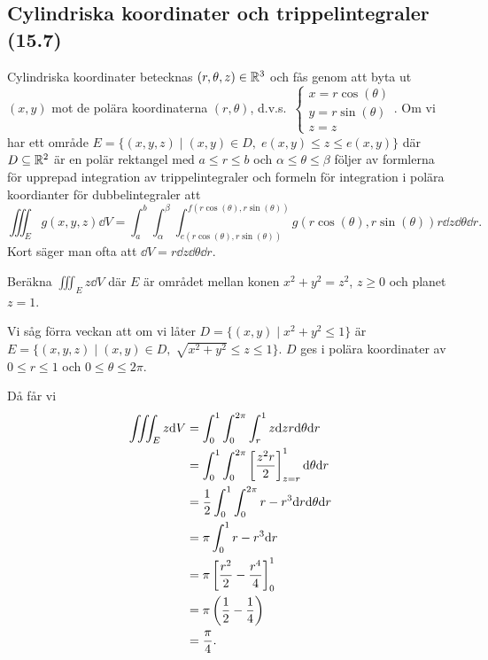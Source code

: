\documentclass[a4paper]{article}
\begin{document}

\subsection{Cylindriska koordinater och trippelintegraler (15.7)}
Cylindriska koordinater betecknas \(
    (r,\theta,z) \in \mathbb{R}^3
\) och fås genom att byta ut \(
    (x,y)
\) mot de polära koordinaterna \(
    (r,\theta)
\), d.v.s.\ \(
    \left\{\begin{matrix}
        x = r \cos(\theta)\\ 
        y = r \sin(\theta)\\ 
        z = z
    \end{matrix}\right.
\). Om vi har ett område \(
    E = \{ (x,y,z) \; | \; (x,y) \in D, \; e(x,y) \leq z \leq e(x,y) \}
\) där \(
    D \subseteq \mathbb{R}^2 
\) är en polär rektangel med \(
    a \leq r \leq b
\) och \(
    \alpha \leq \theta \leq \beta 
\) följer av formlerna för upprepad integration av trippelintegraler och 
formeln för integration i polära koordianter för dubbelintegraler att \[
    \iiint_E g(x,y,z) \dd V = \int_a^b \int_\alpha^\beta \int_{e(r\cos(\theta), r\sin(\theta))}^{f(r\cos(\theta), r\sin(\theta))} g(r\cos(\theta), r\sin(\theta)) r \dd z \dd \theta \dd r.
\] 
Kort säger man ofta att \(
    \dd V = r \dd z \dd \theta \dd r
\).

\begin{ex}
    Beräkna \(
        \iiint_E z \dd V
    \) där \(
        E 
    \) är området mellan konen \(
        x^2+y^2=z^2
    \), \(
        z \geq 0
    \) och planet \(
        z = 1
    \). 

    Vi såg förra veckan att om vi låter \(
        D = \{ (x,y) \; | \; x^2+y^2\leq 1\}
    \) är \(
        E = \{ (x,y,z) \; | \; (x,y) \in D,\; \sqrt{x^2+y^2}\leq z \leq 1 \}
    \). \(
        D 
    \) ges i polära koordinater av \(
        0 \leq r \leq 1
    \) och \(
        0 \leq \theta \leq 2\pi
    \). 

    Då får vi  
    \begin{align*}
        \iiint_E z \dd V &= \int_0^1 \int_0^{2\pi} \int_r^1 z \dd z r \dd \theta \dd r \\
                         &= \int_0^1 \int_0^{2\pi} \left[ \frac{z^2r}{2}  \right]_{z=r}^1 \dd \theta \dd r \\
                         &= \frac{1}{2} \int_0^1 \int_0^{2\pi} r - r^3 \dd r \dd \theta \dd r \\
                         &= \pi \int_0^1 r - r^3 \dd r \\
                         &= \pi \left[ \frac{r^2}{2} - \frac{r^4}{4} \right]_0^1 \\
                         &= \pi \left( \frac{1}{2} - \frac{1}{4} \right) \\
                         &= \frac{\pi}{4}.
    \end{align*}
\end{ex}
\end{document}
